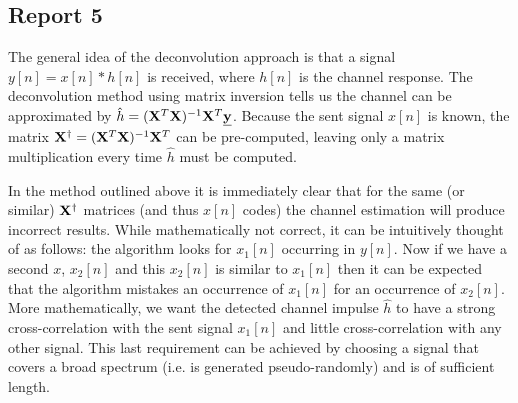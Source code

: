 \documentclass[11pt,titlepage]{report}
\begin{document}
\subsection{Report 5}
\label{subsec:ass2-report5}
The general idea of the deconvolution approach is that a signal $y[n]=x[n]*h[n]$ is received, where $h[n]$ is the channel response. The deconvolution method using matrix inversion tells us the channel can be approximated by $\hat{h}=(\mathbf{X}^T\mathbf{X})^{-1}\mathbf{X}^T\mathbf{\underline{y}}$. Because the sent signal $x[n]$ is known, the matrix $\mathbf{X}^\dagger=(\mathbf{X}^T\mathbf{X})^{-1}\mathbf{X}^T$ can be pre-computed, leaving only a matrix multiplication every time $\hat{h}$ must be computed. 

In the method outlined above it is immediately clear that for the same (or similar) $\mathbf{X}^\dagger$ matrices (and thus $x[n]$ codes) the channel estimation will produce incorrect results. While mathematically not correct, it can be intuitively thought of as follows: the algorithm looks for $x_1[n]$ occurring in $y[n]$. Now if we have a second $x$, $x_2[n]$ and this $x_2[n]$ is similar to $x_1[n]$ then it can be expected that the algorithm mistakes an occurrence of $x_1[n]$ for an occurrence of $x_2[n]$. More mathematically, we want the detected channel impulse $\hat{h}$ to have a strong cross-correlation with the sent signal $x_1[n]$ and little cross-correlation with any other signal. This last requirement can be achieved by choosing a signal that covers a broad spectrum (i.e. is generated pseudo-randomly) and is of sufficient length.
\end{document}
